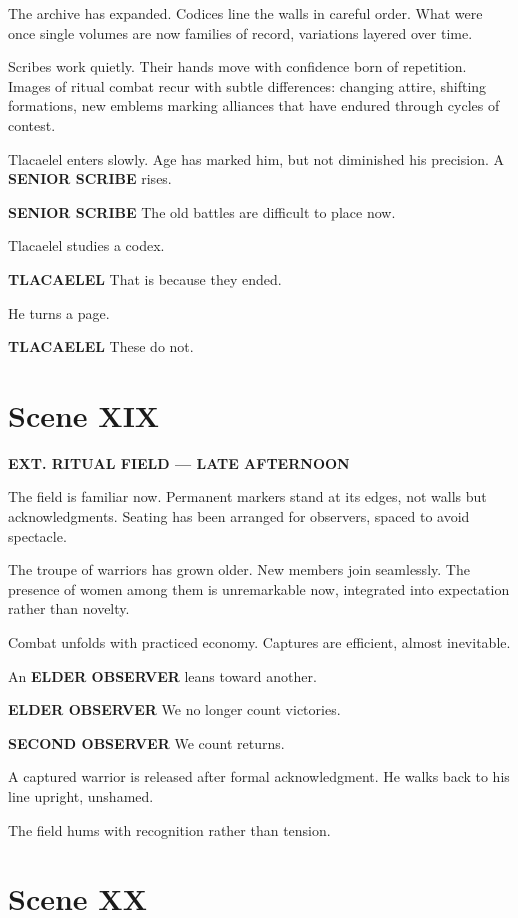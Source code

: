 \documentclass[12pt]{article}
\begin{document}
The archive has expanded. Codices line the walls in careful order. What were once single volumes are now families of record, variations layered over time.

Scribes work quietly. Their hands move with confidence born of repetition. Images of ritual combat recur with subtle differences: changing attire, shifting formations, new emblems marking alliances that have endured through cycles of contest.

Tlacaelel enters slowly. Age has marked him, but not diminished his precision. A \textbf{SENIOR SCRIBE} rises.

\textbf{SENIOR SCRIBE}  
The old battles are difficult to place now.

Tlacaelel studies a codex.

\textbf{TLACAELEL}  
That is because they ended.

He turns a page.

\textbf{TLACAELEL}  
These do not.

\section*{Scene XIX}

\textbf{EXT. RITUAL FIELD --- LATE AFTERNOON}

The field is familiar now. Permanent markers stand at its edges, not walls but acknowledgments. Seating has been arranged for observers, spaced to avoid spectacle.

The troupe of warriors has grown older. New members join seamlessly. The presence of women among them is unremarkable now, integrated into expectation rather than novelty.

Combat unfolds with practiced economy. Captures are efficient, almost inevitable.

An \textbf{ELDER OBSERVER} leans toward another.

\textbf{ELDER OBSERVER}  
We no longer count victories.

\textbf{SECOND OBSERVER}  
We count returns.

A captured warrior is released after formal acknowledgment. He walks back to his line upright, unshamed.

The field hums with recognition rather than tension.

\section*{Scene XX}
\end{document}
